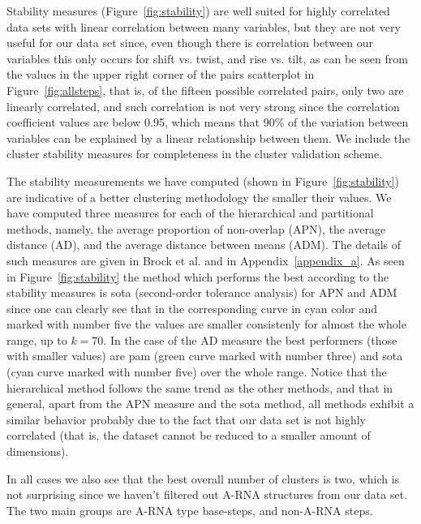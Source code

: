 Stability  measures (Figure~\ref{fig:stability})  are well  suited for
highly  correlated  data sets  with  linear  correlation between  many
variables, but they  are not very useful for our  data set since, even
though there is correlation between our variables this only occurs for
shift vs. twist, and rise vs. tilt,  as can be seen from the values in
the    upper   right    corner   of    the   pairs    scatterplot   in
Figure~\ref{fig:allsteps},  that   is,  of  the   fifteen  possible
correlated  pairs,   only  two  are  linearly   correlated,  and  such
correlation  is  not very  strong  since  the correlation  coefficient
values are below 0.95, which  means that 90\% of the variation between
variables can be  explained by a linear relationship  between them. We
include the cluster stability measures for completeness in the cluster
validation scheme.

The    stability   measurements   we    have   computed    (shown   in
Figure~\ref{fig:stability})  are  indicative  of a  better  clustering
methodology the smaller their values.  We have computed three measures
for  each of  the hierarchical  and partitional  methods,  namely, the
average proportion  of non-overlap  (APN), the average  distance (AD),
and the  average distance  between means (ADM).   The details  of such
measures  are   given  in  Brock  et  al.    \cite{brock2008}  and  in
Appendix~\ref{appendix_a}.  As  seen in Figure~\ref{fig:stability} the
method which performs the best  according to the stability measures is
sota (second-order tolerance  analysis) for APN and ADM  since one can
clearly see that  in the corresponding curve in  cyan color and marked
with number  five the  values are smaller  consistenly for  almost the
whole range,  up to $k=70$.   In the case  of the AD measure  the best
performers  (those with smaller  values) are  pam (green  curve marked
with number three) and sota  (cyan curve marked with number five) over
the whole range.  Notice that the hierarchical method follows the same
trend as  the other methods, and  that in general, apart  from the APN
measure and  the sota method,  all methods exhibit a  similar behavior
probably due  to the fact that  our data set is  not highly correlated
(that  is,  the dataset  cannot  be reduced  to  a  smaller amount  of
dimensions).

In all cases  we also see that the best overall  number of clusters is
two,  which is  not surprising  since  we haven't  filtered out  A-RNA
structures  from our  data set.  The two  main groups  are  A-RNA type
base-steps, and non-A-RNA steps.

